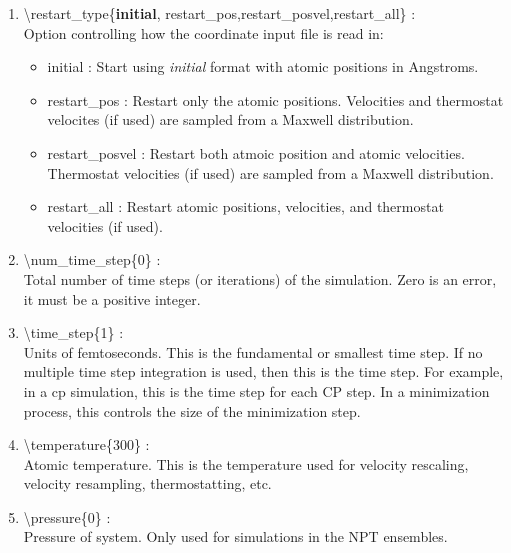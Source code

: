 \documentclass[12pt,titlepage]{article}
\begin{document}
\begin{enumerate}
 \vspace{0.15in} 
 \item  \textbackslash restart\_type\{{\bf initial},
             restart\_pos,restart\_posvel,restart\_all\} : \\
     Option controlling how the coordinate input file is read in:
     \begin{itemize}
       \item { initial} : Start using {\it initial} format 
                                        with atomic positions in Angstroms.
       \item { restart\_pos} : Restart only the atomic positions.
                    Velocities and thermostat velocites (if used) are 
                    sampled from a Maxwell distribution.
       \item { restart\_posvel} :  Restart both atmoic position 
                     and atomic velocities.  Thermostat velocities (if used) 
                     are sampled from a Maxwell distribution.
       \item { restart\_all} : Restart atomic positions, 
                     velocities, and thermostat velocities (if used).
     \end{itemize}



 \vspace{0.15in} 
 \item  \textbackslash num\_time\_step\{0\} : \\
Total number of time steps (or iterations) of the simulation.  Zero is
an error, it must be a positive integer.  

 \vspace{0.15in} 
 \item   \textbackslash time\_step\{1\} : \\
Units of femtoseconds.  This is the fundamental or smallest time
step. If no multiple time step integration is used, then this is the
time step.  For example, in a cp simulation, this is the time step for
each CP step.  In a minimization process, this controls the size of
the minimization step.


 \vspace{0.15in} 
 \item   \textbackslash temperature\{300\} : \\
     Atomic temperature.  This is the temperature used for velocity rescaling,
     velocity resampling, thermostatting, etc.


 \vspace{0.15in} 
 \item   \textbackslash pressure\{0\} : \\
     Pressure of system.  Only used for simulations in the NPT ensembles.


\end{enumerate}
\end{document}
